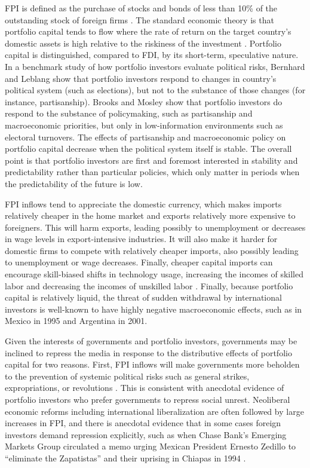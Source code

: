 \documentclass[12pt,a4paper]{article}\usepackage[]{graphicx}\usepackage[]{color}
\begin{document}
FPI is defined as the purchase of stocks and bonds of less than 10\% of the outstanding stock of foreign firms \parencites{kenen1994exchange}{Walther:1997wf}. The standard economic theory is that portfolio capital tends to flow where the rate of return on the target country's domestic assets is high relative to the riskiness of the investment \parencites[743]{mosley2003global}[685]{ISQU:ISQU420}. Portfolio capital is distinguished, compared to FDI, by its short-term, speculative nature. In a benchmark study of how portfolio investors evaluate political risks, Bernhard and Leblang \parencite*{Bernhard:2003kb} show that portfolio investors respond to changes in country's political system (such as elections), but not to the substance of those changes (for instance, partisanship). Brooks and Mosley \parencite*{Brooks:2007we} show that portfolio investors do respond to the substance of policymaking, such as partisanship and macroeconomic priorities, but only in low-information environments such as electoral turnovers. The effects of partisanship and macroeconomic policy on portfolio capital decrease when the political system itself is stable. The overall point is that portfolio investors are first and foremost interested in stability and predictability rather than particular policies, which only matter in periods when the predictability of the future is low.

FPI inflows tend to appreciate the domestic currency, which makes imports relatively cheaper in the home market and exports relatively more expensive to foreigners. This will harm exports, leading possibly to unemployment or decreases in wage levels in export-intensive industries. It will also make it harder for domestic firms to compete with relatively cheaper imports, also possibly leading to unemployment or wage decreases. Finally, cheaper capital imports can encourage skill-biased shifts in technology usage, increasing the incomes of skilled labor and decreasing the incomes of unskilled labor \parencites{Cragg:1996iy}{Ros:2000vy}. Finally, because portfolio capital is relatively liquid, the threat of sudden withdrawal by international investors is well-known to have highly negative macroeconomic effects, such as in Mexico in 1995 and Argentina in 2001.

Given the interests of governments and portfolio investors, governments may be inclined to repress the media in response to the distributive effects of portfolio capital for two reasons. First, FPI inflows will make governments more beholden to the prevention of systemic political risks such as general strikes, expropriations, or revolutions \parencite{Clark:1997jg}. This is consistent with anecdotal evidence of portfolio investors who prefer governments to repress social unrest. Neoliberal economic reforms including international liberalization are often followed by large increases in FPI, and there is anecdotal evidence that in some cases foreign investors demand repression explicitly, such as when Chase Bank's Emerging Markets Group circulated a memo urging Mexican President Ernesto Zedillo to “eliminate the Zapatistas” and their uprising in Chiapas in 1994 \parencite{Silverstein:1995wc}.
\end{document}
